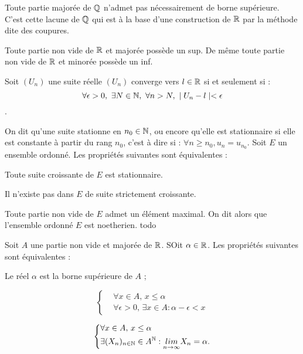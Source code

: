 
\medskip

\bw
Toute partie majorée de $\mathbb{Q}$ n'admet pas nécessairement de borne supérieure. C'est cette lacune de $\mathbb{Q}$ qui est à la base d'une construction de $\mathbb{R}$ par la méthode dite des coupures.
\ew

\medskip

\bp
Toute partie non vide de $\mathbb{R}$ et majorée possède un sup. De même toute partie non vide de $\mathbb{R}$ et minorée possède un inf.
\ep

\bigskip

\bd
Soit $(U_n)$ une suite réelle $(U_n)$ converge vers $l\in\mathbb{R}$ si et seulement si : $$\forall \epsilon > 0, ~ \exists N \in \mathbb{N}, ~ \forall n > N, ~ \mid U_n - l \mid < \epsilon$$.
\ed

\medskip

On dit qu'une suite stationne en $n_0 \in \mathbb{N}$, ou encore qu'elle est stationnaire si elle est constante à partir du rang $n_0$, c'est à dire si : $\forall n \geq n_0, u_n = u_{n_0}$.
\bp
Soit $E$ un ensemble ordonné. Les propriétés suivantes sont équivalentes : 
\ben
\item Toute suite croissante de $E$ est stationnaire.
\item Il n'existe pas dans $E$ de suite strictement croissante.
\item Toute partie non vide de $E$ admet un élément maximal.
\een
On dit alors que l'ensemble ordonné $E$ est noetherien.
\ep
\bpf 
todo
\epf

Soit $A$ une partie non vide et majorée de $\mathbb{R}$. SOit $\alpha \in \mathbb{R}$. Les propriétés suivantes sont équivalentes : 
\ben
\item Le réel $\alpha$ est la borne supérieure de $A$ ;
\item 
\[
\left\{
\begin{aligned}
    &\forall x \in A, \, x \leq \alpha \\
    &\forall \epsilon > 0, \, \exists x \in A : \alpha - \epsilon < x
\end{aligned}
\right.
\]
\item 
\[
\left\{
\begin{aligned}
    &\forall x \in A, \, x \leq \alpha \\
    &\exists (X_n)_{n \in \mathbb{N}} \in A^{\mathbb{N}}: \underset{n \to \infty}{lim} X_n = \alpha.
\end{aligned}
\right.
\]
\een
\ep

